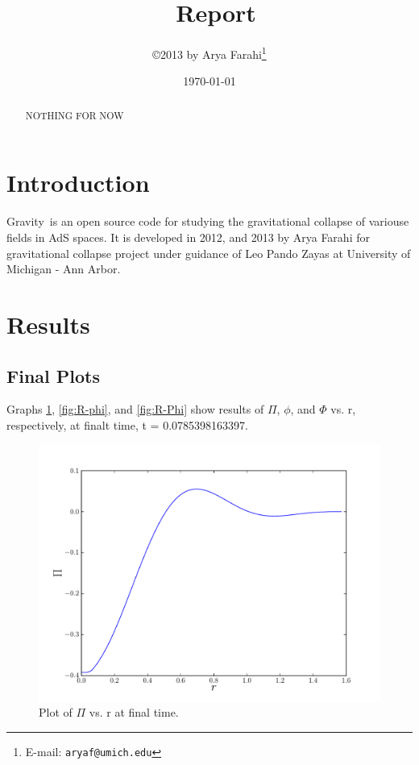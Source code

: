 \documentclass[12pt]{article}
\title{\grv\ Report}
\author{\copyright 2013 by Arya Farahi\thanks{E-mail: {\tt aryaf@umich.edu}}}
\date{\today}
\def\grv{{\sc Gravity}}
\begin{document}
\maketitle

\begin{abstract}
NOTHING FOR NOW
\end{abstract}


\section{Introduction}

\grv\ is an open source code for studying the gravitational collapse of variouse fields in AdS spaces. It is developed in 2012, and 2013 by Arya Farahi for gravitational collapse project under guidance of Leo Pando Zayas at University of Michigan - Ann Arbor. 
\section{Results}
\subsection{Final Plots}

Graphs \ref{fig:R-Pi}, \ref{fig:R-phi}, and \ref{fig:R-Phi} show results of $\Pi$, $\phi$, and $\Phi$ vs. r, respectively, at finalt time, t =  0.0785398163397.

\begin{figure}[hbt]
 \centering
 \includegraphics[width=12cm]{./Report/PivrR.pdf}
 \caption{Plot of $\Pi$ vs. r at final time.}
 \label{fig:R-Pi}
\end{figure}
\end{document}
